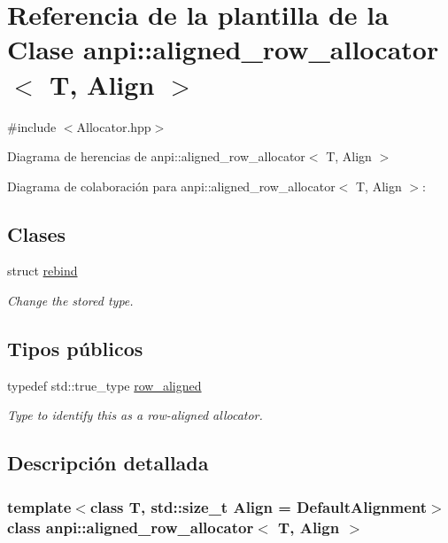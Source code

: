\hypertarget{classanpi_1_1aligned__row__allocator}{}\section{Referencia de la plantilla de la Clase anpi\+:\+:aligned\+\_\+row\+\_\+allocator$<$ T, Align $>$}
\label{classanpi_1_1aligned__row__allocator}


{\ttfamily \#include $<$Allocator.\+hpp$>$}



Diagrama de herencias de anpi\+:\+:aligned\+\_\+row\+\_\+allocator$<$ T, Align $>$


Diagrama de colaboración para anpi\+:\+:aligned\+\_\+row\+\_\+allocator$<$ T, Align $>$\+:
\subsection*{Clases}
\begin{DoxyCompactItemize}
\item 
struct \hyperlink{structanpi_1_1aligned__row__allocator_1_1rebind}{rebind}
\begin{DoxyCompactList}\small\item\em Change the stored type. \end{DoxyCompactList}\end{DoxyCompactItemize}
\subsection*{Tipos públicos}
\begin{DoxyCompactItemize}
\item 
typedef std\+::true\+\_\+type \hyperlink{classanpi_1_1aligned__row__allocator_a948213c2c7edb9227302f18045428b13}{row\+\_\+aligned}
\begin{DoxyCompactList}\small\item\em Type to identify this as a row-\/aligned allocator. \end{DoxyCompactList}\end{DoxyCompactItemize}


\subsection{Descripción detallada}
\subsubsection*{template$<$class T, std\+::size\+\_\+t Align = Default\+Alignment$>$\newline
class anpi\+::aligned\+\_\+row\+\_\+allocator$<$ T, Align $>$}

